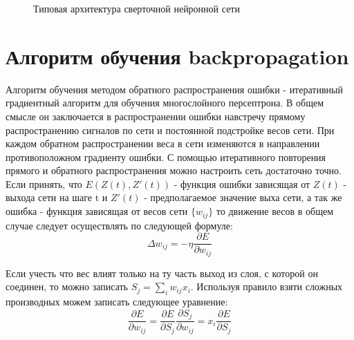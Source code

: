 \documentclass[utf8,usehyperref,14pt]{G7-32}
\begin{document}
\begin{figure}[H]
  \caption{Типовая архитектура сверточной нейронной сети}\label{CNN_arch}
\end{figure}

\section{Алгоритм обучения backpropagation}
Алгоритм обучения методом обратного распространения ошибки - итеративный градиентный алгоритм для обучения многослойного персептрона. В общем смысле он заключается в распространении ошибки навстречу прямому распространению сигналов по сети и постоянной подстройке весов сети. При каждом обратном распространении веса в сети изменяются в направлении противоположном градиенту ошибки. С помощью итеративного повторения прямого и обратного распространения можно настроить сеть достаточно точно. 
Если принять, что $E(Z(t), Z'(t))$ - функция ошибки зависящая от $ Z(t) $ - выхода сети на шаге t и $ Z'(t) $ - предполагаемое значение выха сети, а так же ошибка - функция зависящая от весов сети $ \{w_{ij}\} $ то движение весов в общем случае следует осуществлять по следующей формуле:
\begin{equation}
\Delta w_{ij} = - \eta \frac{\partial E}{\partial w_{ij}}
\end{equation}

Если учесть что вес влият только на ту часть выход из слоя, с которой он соединен, то можно записать $ S_{j} = \sum_{i} w_{ij}x_{i} $. Используя правило взяти сложных производных можем записать следующее уравнение:
\begin{equation}
\frac{\partial E}{\partial w_{ij}} = \frac{\partial E}{\partial S_{j}}\frac{\partial S_{j}}{\partial w_{ij}} = x_{i}\frac{\partial E}{\partial S_{j}}
\end{equation}
\end{document}
